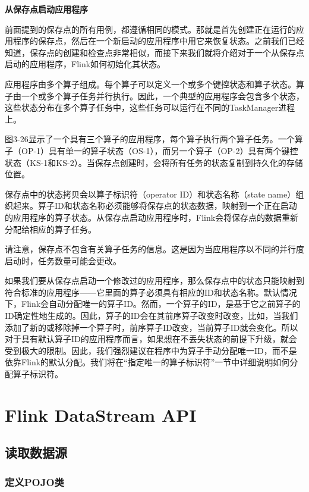 \documentclass[cn,11pt,chinese]{elegantbook}
\begin{document}
\textbf{从保存点启动应用程序}

前面提到的保存点的所有用例，都遵循相同的模式。那就是首先创建正在运行的应用程序的保存点，然后在一个新启动的应用程序中用它来恢复状态。之前我们已经知道，保存点的创建和检查点非常相似，而接下来我们就将介绍对于一个从保存点启动的应用程序，Flink如何初始化其状态。

应用程序由多个算子组成。每个算子可以定义一个或多个键控状态和算子状态。算子由一个或多个算子任务并行执行。因此，一个典型的应用程序会包含多个状态，这些状态分布在多个算子任务中，这些任务可以运行在不同的TaskManager进程上。

图3-26显示了一个具有三个算子的应用程序，每个算子执行两个算子任务。一个算子（OP-1）具有单一的算子状态（OS-1），而另一个算子（OP-2）具有两个键控状态（KS-1和KS-2）。当保存点创建时，会将所有任务的状态复制到持久化的存储位置。

保存点中的状态拷贝会以算子标识符（operator ID）和状态名称（state name）组织起来。算子ID和状态名称必须能够将保存点的状态数据，映射到一个正在启动的应用程序的算子状态。从保存点启动应用程序时，Flink会将保存点的数据重新分配给相应的算子任务。

\begin{note}
    请注意，保存点不包含有关算子任务的信息。这是因为当应用程序以不同的并行度启动时，任务数量可能会更改。
\end{note}

如果我们要从保存点启动一个修改过的应用程序，那么保存点中的状态只能映射到符合标准的应用程序——它里面的算子必须具有相应的ID和状态名称。默认情况下，Flink会自动分配唯一的算子ID。然而，一个算子的ID，是基于它之前算子的ID确定性地生成的。因此，算子的ID会在其前序算子改变时改变，比如，当我们添加了新的或移除掉一个算子时，前序算子ID改变，当前算子ID就会变化。所以对于具有默认算子ID的应用程序而言，如果想在不丢失状态的前提下升级，就会受到极大的限制。因此，我们强烈建议在程序中为算子手动分配唯一ID，而不是依靠Flink的默认分配。我们将在“指定唯一的算子标识符”一节中详细说明如何分配算子标识符。

\chapter{Flink DataStream API}

\section{读取数据源}

\subsection{定义POJO类}
\end{document}
